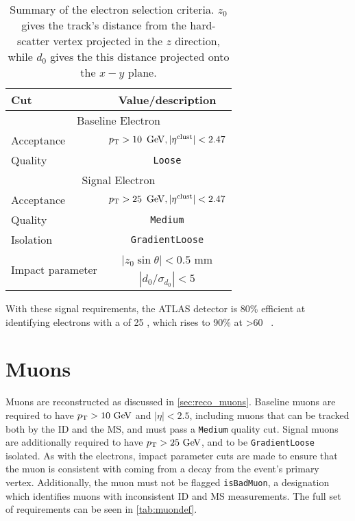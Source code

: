 \begin{table}[ph!]
\begin{center}
    \begin{tabular}{l|c}
      \hline
      Cut            & Value/description \\
      \hline
      \hline
      \multicolumn{2}{c}{Baseline Electron}\\
      \hline
      Acceptance   & $\pt > 10\,\GeV, |\eta^\mathrm{clust}| < 2.47$ \\
      Quality      & \texttt{Loose} \\
      \hline
      \multicolumn{2}{c}{Signal Electron}\\
      \hline
      Acceptance   & $\pt > 25\,\GeV, |\eta^\mathrm{clust}| < 2.47$ \\
      Quality          & \texttt{Medium} \\
      Isolation        & \texttt{GradientLoose} \\
      \multirow{2}{*}{Impact parameter} & $|z_0 \sin\theta|< 0.5$ mm \\
                       & $|d_0/\sigma_{d_0}|< 5$ \\ 
      \hline
      \hline
\end{tabular}
\end{center}
\caption{Summary of the electron selection criteria. $z_0$ gives the track's distance from the hard-scatter vertex projected in the $z$ direction, while $d_0$ gives the this distance projected onto the $x-y$ plane.}              
\label{tab:eledef}
\end{table}

With these signal requirements, the \ac{ATLAS} detector is 80\% efficient at identifying electrons with a \pt of 25 \gev, which rises to 90\% at \pt>60 \gev~\cite{ATLAS-CONF-2014-032}. %

\section{Muons}

Muons are reconstructed as discussed in \autoref{sec:reco_muons}. Baseline muons are required to have $\pt>10\gev$ and $|\eta|<2.5$, including muons that can be tracked both by the \ac{ID} and the \ac{MS}, and must pass a \texttt{Medium} quality cut. Signal muons are additionally required to have $\pt>25\gev$, and to be \texttt{GradientLoose} isolated. As with the electrons, impact parameter cuts are made to ensure that the muon is consistent with coming from a decay from the event's primary vertex. Additionally, the muon must not be flagged \texttt{isBadMuon}, a designation which identifies muons with inconsistent \ac{ID} and \ac{MS} \pt measurements. The full set of requirements can be seen in \autoref{tab:muondef}.

